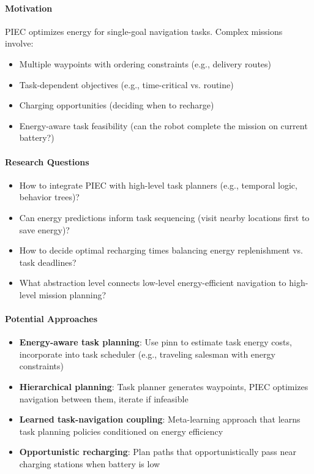 \paragraph{Motivation}
PIEC optimizes energy for single-goal navigation tasks. Complex missions involve:
\begin{itemize}
    \item Multiple waypoints with ordering constraints (e.g., delivery routes)
    \item Task-dependent objectives (e.g., time-critical vs. routine)
    \item Charging opportunities (deciding when to recharge)
    \item Energy-aware task feasibility (can the robot complete the mission on current battery?)
\end{itemize}

\paragraph{Research Questions}
\begin{itemize}
    \item How to integrate PIEC with high-level task planners (e.g., temporal logic, behavior trees)?
    \item Can energy predictions inform task sequencing (visit nearby locations first to save energy)?
    \item How to decide optimal recharging times balancing energy replenishment vs. task deadlines?
    \item What abstraction level connects low-level energy-efficient navigation to high-level mission planning?
\end{itemize}

\paragraph{Potential Approaches}
\begin{itemize}
    \item \textbf{Energy-aware task planning}: Use \acrshort{pinn} to estimate task energy costs, incorporate into task scheduler (e.g., traveling salesman with energy constraints)
    \item \textbf{Hierarchical planning}: Task planner generates waypoints, PIEC optimizes navigation between them, iterate if infeasible
    \item \textbf{Learned task-navigation coupling}: Meta-learning approach that learns task planning policies conditioned on energy efficiency
    \item \textbf{Opportunistic recharging}: Plan paths that opportunistically pass near charging stations when battery is low
\end{itemize}

